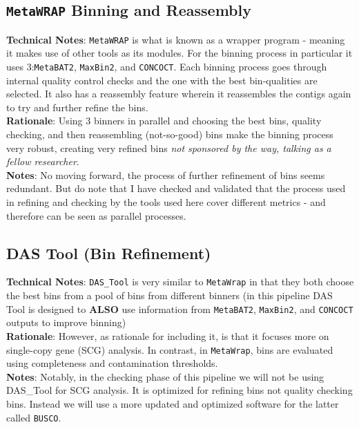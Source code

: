 \documentclass[11pt]{report}
\begin{document}
{\subsection{\texttt{MetaWRAP} Binning and Reassembly}
\textbf{Technical Notes}: \texttt{MetaWRAP} is what is known as a wrapper program - meaning it makes use of other tools as its modules. For the binning process in particular it uses 3:\texttt{MetaBAT2}, \texttt{MaxBin2}, and \texttt{CONCOCT}. Each binning process goes through internal quality control checks and the one with the best bin-qualities are selected. It also has a reassembly feature wherein it reassembles the contigs again to try and further refine the bins.\\
\textbf{Rationale}: Using 3 binners in parallel and choosing the best bins, quality checking, and then reassembling (not-so-good) bins make the binning process very robust, creating very refined bins \textit{not sponsored by the way, talking as a fellow researcher}. \\
\textbf{Notes}: No moving forward, the process of further refinement of bins seems redundant. But do note that I have checked and validated that the process used in refining and checking by the tools used here cover different metrics - and therefore can be seen as parallel processes.  

\subsection{DAS Tool (Bin Refinement)}
\textbf{Technical Notes}: \texttt{DAS\_Tool} is very similar to \texttt{MetaWrap} in that they both choose the best bins from a pool of bins from different binners (in this pipeline DAS Tool is designed to \textbf{ALSO} use information from \texttt{MetaBAT2}, \texttt{MaxBin2}, and \texttt{CONCOCT} outputs to improve binning)  \\
\textbf{Rationale}: However, as rationale for including it, is that it focuses more on single-copy gene (SCG) analysis. In contrast, in  \texttt{MetaWrap}, bins are evaluated using completeness and contamination thresholds. \\
\textbf{Notes}: Notably, in the checking phase of this pipeline we will not be using DAS\_Tool for SCG analysis. It is optimized for refining bins not quality checking bins. Instead we will use a more updated and optimized software for the latter called \texttt{BUSCO}. 

}
\end{document}
